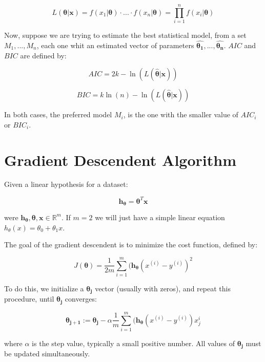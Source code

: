 \begin{equation}
L(\boldsymbol{\theta}|\boldsymbol{x} ) =  f(x_1|\boldsymbol{\theta})\cdot...\cdot f(x_n|\boldsymbol{\theta}) = \prod_{i = 1}^{n}f(x_i|\boldsymbol{\theta})
\end{equation}

Now, suppose we are trying to estimate the best statistical model, from a set ${M_1, ..., M_n}$, each one whit an estimated vector of parameters  ${\boldsymbol{\hat{\theta_1}}}, ..., {\boldsymbol{\hat{\theta_n}}}$. $AIC$ and $BIC$ are defined by:

\begin{equation}
AIC = 2k - \ln(L(\boldsymbol{\hat{\theta}}|\boldsymbol{x}))
\end{equation}

\begin{equation}
BIC = k\ln(n) - \ln(L(\boldsymbol{\hat{\theta}}|\boldsymbol{x}))
\end{equation}

In both cases, the preferred model $M_i$, is the one with the smaller value of $AIC_i$ or $BIC_i$.


\section{Gradient Descendent Algorithm}

Given a linear hypothesis for a dataset:

\begin{equation}
	\boldsymbol{h_{\theta}} = \boldsymbol{\theta}^{T}\boldsymbol{x} 
\end{equation}

were $\boldsymbol{h_{\theta}}, \boldsymbol{\theta}, \boldsymbol{x} \in \mathbb{R}^{m}$. If $m = 2$ we will just have a simple linear equation $h_{\theta}(x) = \theta_{0} + \theta_{1}x$.

The goal of the gradient descendent is to minimize the cost function, defined by:

\begin{equation}
	J(\boldsymbol{\theta}) = \frac{1}{2m} \sum_{i = 1}^{m}  ( \boldsymbol{h_{\theta}}(x^{(i)} - y^{(i)} )^{2}
\end{equation}




To do this, we initialize a $\boldsymbol{\theta_{j}}$ vector (usually with zeros), and repeat this procedure, until $\boldsymbol{\theta_{j}}$ converges:

\begin{equation}
	\boldsymbol{\theta_{j + 1}} := \boldsymbol{\theta_{j}} - \alpha \frac{1}{m} \sum_{i = 1}^{m}  ( \boldsymbol{h_{\theta}}(x^{(i)} - y^{(i)} )x_{j}^{i}
\end{equation}

where $\alpha$ is the step value, typically a small positive number. All values of $\boldsymbol{\theta_{j}}$ must be updated simultaneously. 

